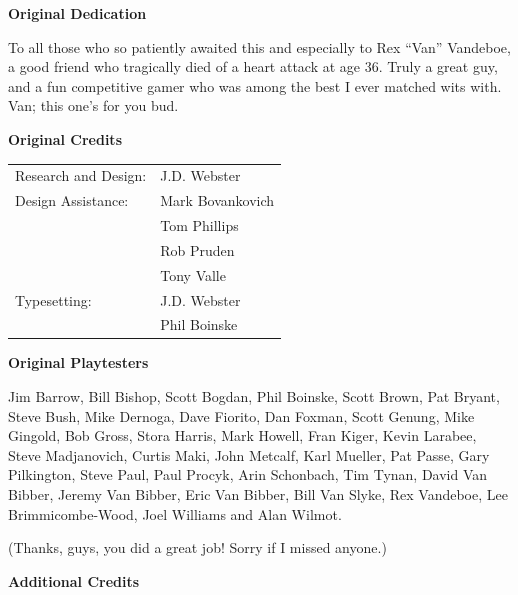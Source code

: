 \begin{center}
\textbf{\Large Original Dedication}
\end{center}

To all those who so patiently awaited this and especially to Rex “Van” Vandeboe, a good friend who tragically died of a heart attack at age 36. Truly a great guy, and a fun competitive gamer who was among the best I ever matched wits with. Van; this one’s for you bud.

\begin{center}
\textbf{\Large Original Credits}
\end{center}

\begin{tabularx}{\linewidth}{@{}LL@{}}
Research and Design: &J.D. Webster\\
Design Assistance:   &Mark Bovankovich\\
                     &Tom Phillips\\
                     &Rob Pruden\\
                     &Tony Valle\\
Typesetting:         &J.D. Webster\\
                     &Phil Boinske\\
\end{tabularx}

\begin{center}
\textbf{\Large Original Playtesters}
\end{center}

{
\sloppy
Jim Barrow, Bill Bishop, Scott Bogdan, Phil Boinske, Scott Brown, Pat Bryant, Steve Bush, Mike Dernoga, Dave Fiorito, Dan Foxman, Scott Genung, Mike Gingold, Bob Gross, Stora Harris, Mark Howell, Fran Kiger, Kevin Larabee, Steve Madjanovich, Curtis Maki, John Metcalf, Karl Mueller, Pat Passe, Gary Pilkington, Steve Paul, Paul Procyk, Arin Schonbach, Tim Tynan, David Van Bibber, Jeremy Van Bibber, Eric Van Bibber, Bill Van Slyke, Rex Vandeboe, Lee Brimmicombe-Wood, Joel Williams and Alan Wilmot.
\par
}

(Thanks, guys, you did a great job! Sorry if I missed anyone.)

\newpage

\begin{center}
\textbf{\Large Additional Credits}
\end{center}


